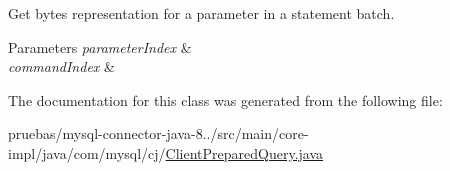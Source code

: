 Get bytes representation for a parameter in a statement batch.


\begin{DoxyParams}{Parameters}
{\em parameter\+Index} & \\
\hline
{\em command\+Index} & \\
\hline
\end{DoxyParams}


The documentation for this class was generated from the following file\+:\begin{DoxyCompactItemize}
\item 
pruebas/mysql-\/connector-\/java-\/8../src/main/core-\/impl/java/com/mysql/cj/\mbox{\hyperlink{_client_prepared_query_8java}{Client\+Prepared\+Query.\+java}}\end{DoxyCompactItemize}

